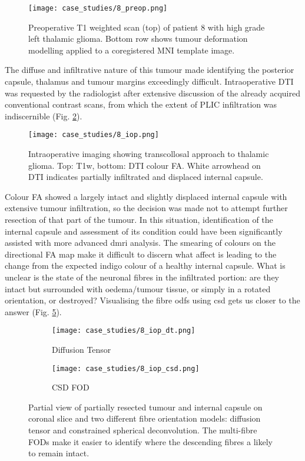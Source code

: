 \begin{figure}
  \centering
  \texttt{[image: case\_studies/8\_preop.png]}
  \caption{Preoperative T1 weighted scan (top) of patient 8 with high grade left thalamic glioma. Bottom row shows tumour deformation modelling applied to a coregistered MNI template image.}
  \label{fig:8p}
\end{figure}

The diffuse and infiltrative nature of this tumour made identifying the posterior capsule, thalamus and tumour margins exceedingly difficult.
Intraoperative DTI was requested by the radiologist after extensive discussion of the already acquired conventional contrast scans, from which the extent of PLIC infiltration was indiscernible (Fig. \ref{fig:8i}).

\begin{figure}
  \centering
  \texttt{[image: case\_studies/8\_iop.png]}
  \caption{Intraoperative imaging showing transcollosal approach to thalamic glioma. Top: T1w, bottom: DTI colour FA. White arrowhead on DTI indicates partially infiltrated and displaced internal capsule.}
  \label{fig:8i}
\end{figure}

Colour FA showed a largely intact and slightly displaced internal capsule with extensive tumour infiltration, so the decision was made not to attempt further resection of that part of the tumour.
In this situation, identification of the internal capsule and assessment of its condition could have been significantly assisted with more advanced \gls{dmri} analysis.
The smearing of colours on the directional FA map make it difficult to discern what affect is leading to the change from the expected indigo colour of a healthy internal capsule.
What is unclear is the state of the neuronal fibres in the infiltrated portion: are they intact but surrounded with oedema/tumour tissue, or simply in a rotated orientation, or destroyed?
Visualising the fibre \glspl{odf} using \gls{csd} gets us closer to the answer (Fig. \ref{fig:8i_fod}).

\begin{figure}
  \centering
  \begin{subfigure}{0.3\textwidth}
    \centering
    \texttt{[image: case\_studies/8\_iop\_dt.png]}
    \caption{Diffusion Tensor}
    \label{fig:8i_dt}
  \end{subfigure}%
  \begin{subfigure}{0.3\textwidth}
    \centering
    \texttt{[image: case\_studies/8\_iop\_csd.png]}
    \caption{CSD FOD}
    \label{fig:8i_csd}
  \end{subfigure}%
  \caption{Partial view of partially resected tumour and internal capsule on coronal slice and two different fibre orientation models: diffusion tensor and constrained spherical deconvolution. The multi-fibre FODs make it easier to identify where the descending fibres a likely to remain intact. }
  \label{fig:8i_fod}
\end{figure}


